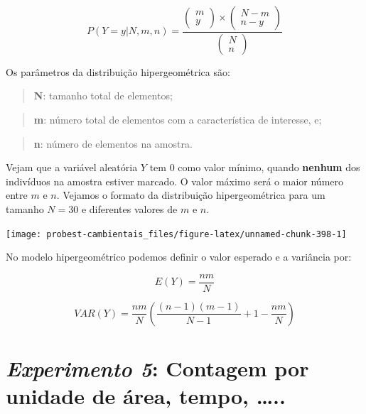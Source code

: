 \documentclass[
]{book}
\begin{document}
\[P(Y=y|N,m,n) = \frac{\left (\begin{array}{c} m \\ y \end{array}\right) \times \left (\begin{array}{c} N-m \\ n-y \end{array}\right)}{\left (\begin{array}{c} N \\ n \end{array}\right)}\]

Os parâmetros da distribuição hipergeométrica são:

\begin{quote}
\textbf{N}: tamanho total de elementos;
\end{quote}

\begin{quote}
\textbf{m}: número total de elementos com a característica de interesse, e;
\end{quote}

\begin{quote}
\textbf{n}: número de elementos na amostra.
\end{quote}

Vejam que a variável aleatória \(Y\) tem \(0\) como valor mínimo, quando \textbf{nenhum} dos indivíduos na amostra estiver marcado. O valor máximo será o maior número entre \(m\) e \(n\). Vejamos o formato da distribuição hipergeométrica para um tamanho \(N = 30\) e diferentes valores de \(m\) e \(n\).

\begin{center}\texttt{[image: probest-cambientais\_files/figure-latex/unnamed-chunk-398-1]} \end{center}

No modelo hipergeométrico podemos definir o valor esperado e a variância por:

\[E(Y) = \frac{n m}{N}\]

\[VAR(Y) = \frac{n m}{N}(\frac{(n-1)(m-1)}{N-1}+1-\frac{n m}{N})\]

\hypertarget{experimento-5-contagem-por-unidade-de-uxe1rea-tempo-..}{%
\section{\texorpdfstring{\emph{Experimento 5}: Contagem por unidade de área, tempo, \ldots..}{Experimento 5: Contagem por unidade de área, tempo, \ldots..}}\label{experimento-5-contagem-por-unidade-de-uxe1rea-tempo-..}}
\end{document}
